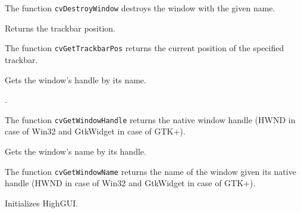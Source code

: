 \begin{description}
\end{description}

The function \texttt{cvDestroyWindow} destroys the window with the given name.

Returns the trackbar position.


\begin{description}
\end{description}

The function \texttt{cvGetTrackbarPos} returns the current position of the specified trackbar.

\ifC

Gets the window's handle by its name.


\begin{description}
.
\end{description}

The function \texttt{cvGetWindowHandle} returns the native window handle (HWND in case of Win32 and GtkWidget in case of GTK+).

Gets the window's name by its handle.


\begin{description}
\end{description}

The function \texttt{cvGetWindowName} returns the name of the window given its native handle (HWND in case of Win32 and GtkWidget in case of GTK+).

Initializes HighGUI.


\begin{description}
\end{description}

